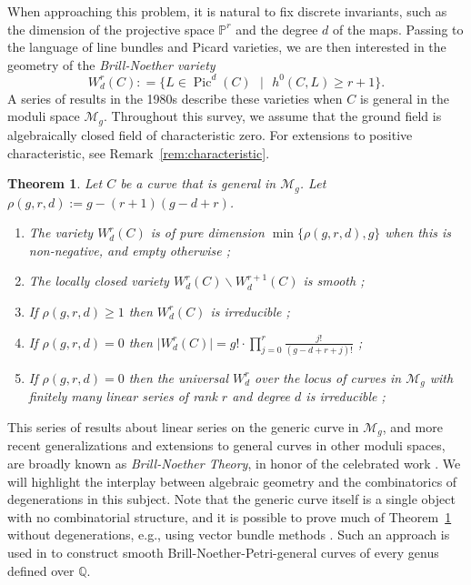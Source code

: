 \documentclass{amsart}
\newtheorem{theorem}{Theorem}[section]
\theoremstyle{definition}
\newcommand{\PP}{\mathbb{P}}
\newcommand{\Pic}{\operatorname{Pic}}
\begin{document}
When approaching this problem, it is natural to fix discrete invariants, such as the dimension of the projective space $\PP^r$ and the degree $d$ of the maps.  Passing to the language of line bundles and Picard varieties, we are then interested in the geometry of the \emph{Brill-Noether variety}
\[
W^r_d (C) \colon = \Big\{ L \in \Pic^d (C) \mbox{ } \vert \mbox{ } h^0 (C,L) \geq r+1 \Big\}. 
\]
A series of results in the 1980s describe these varieties when $C$ is general in the moduli space $\mathcal{M}_g$.  Throughout this survey, we assume that the ground field is algebraically closed field of characteristic zero. For extensions to positive characteristic, see Remark~\ref{rem:characteristic}.

\begin{theorem}
\label{Thm:BN}
Let $C$ be a curve that is general in $\mathcal{M}_g$.  Let $\rho (g,r,d) := g-(r+1)(g-d+r)$.
\begin{enumerate}
\item  The variety $W^r_d (C)$ is of pure dimension $\min\{\rho (g,r,d),g\}$ when this is non-negative, and empty otherwise \cite{GriffithsHarris80}{\em ;}
\item The locally closed variety $W^r_d (C) \smallsetminus W^{r+1}_d(C)$ is smooth \cite{Gieseker82}{\em ;}
\item  If $\rho (g,r,d) \geq 1$ then $W^r_d (C)$ is irreducible  \cite{FultonLazarsfeld81, Gieseker82}{\em ;}
\item  If $\rho(g,r,d) = 0$ then $\vert W^r_d (C) \vert = g! \cdot \prod_{j=0}^r \frac{j!}{(g-d+r+j)!}$  \cite{Kempf71, KleimanLaksov72, GriffithsHarris80}{\em ;}
\item If $\rho(g,r,d) = 0$ then the universal $W^r_d$ over the locus of curves in $\mathcal{M}_g$ with finitely many linear series of rank $r$ and degree $d$ is irreducible \cite{EisenbudHarris87}{\em ;}
\end{enumerate}
\end{theorem}

This series of results about linear series on the generic curve in $\mathcal{M}_g$, and more recent generalizations and extensions to general curves in other moduli spaces, are broadly known as \emph{Brill-Noether Theory}, in honor of the celebrated work \cite{BN1874}. We will highlight the interplay between algebraic geometry and the combinatorics of degenerations in this subject. Note that the generic curve itself is a single object with no combinatorial structure, and it is possible to prove much of Theorem~\ref{Thm:BN} without degenerations, e.g., using vector bundle methods  \cite{Lazarsfeld86}.  Such an approach is used in \cite{ABFS16} to construct smooth Brill-Noether-Petri-general curves of every genus defined over $\mathbb{Q}$.    
\end{document}

